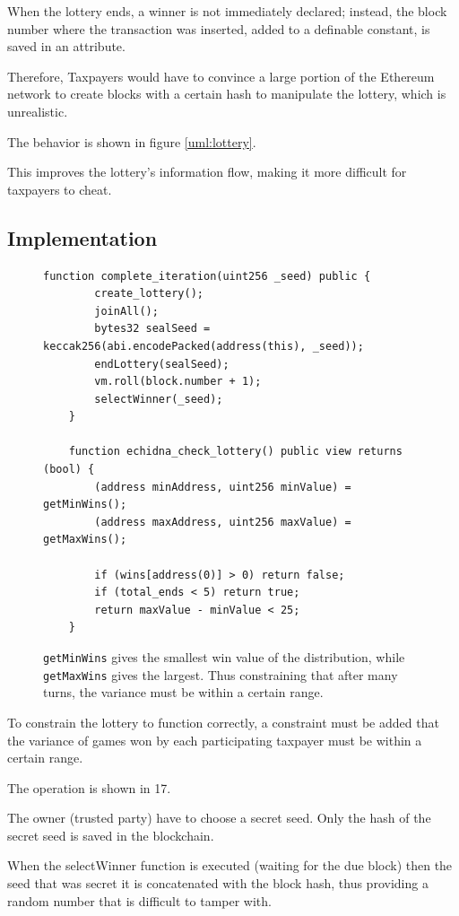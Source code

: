 \documentclass[conference]{IEEEtran}
\begin{document}
When the lottery ends, a winner is not immediately declared; instead, the block number where
the transaction was inserted, added to a definable constant, is saved in an attribute.

Therefore, Taxpayers would have to convince a large portion of the Ethereum network to create blocks with a certain hash
to manipulate the lottery, which is unrealistic.


The behavior is shown in figure \ref{uml:lottery}.

This improves the lottery's information flow, making it more difficult for taxpayers to cheat.

\subsection{Implementation}

\begin{figure}
	\label{code:V_lottery2}
	\centering
	\begin{lstlisting}[style=soliditystyle]
    function complete_iteration(uint256 _seed) public {
        create_lottery();
        joinAll();
        bytes32 sealSeed = keccak256(abi.encodePacked(address(this), _seed));
        endLottery(sealSeed);
        vm.roll(block.number + 1);
        selectWinner(_seed);
    }

    function echidna_check_lottery() public view returns (bool) {
        (address minAddress, uint256 minValue) = getMinWins();
        (address maxAddress, uint256 maxValue) = getMaxWins();

        if (wins[address(0)] > 0) return false;
        if (total_ends < 5) return true;
        return maxValue - minValue < 25;
    }
  \end{lstlisting}
	\caption{\texttt{getMinWins} gives the smallest win value of the distribution, while \texttt{getMaxWins} gives the largest. Thus constraining that after
		many turns, the variance must be within a certain range.}
\end{figure}


To constrain the lottery to function correctly, a constraint must be added
that the variance of games won by each participating taxpayer must be within a certain range.

The operation is shown in 17.%

The owner (trusted party) have to choose a secret seed. Only the hash of the secret seed is saved in the blockchain.

When the selectWinner function is executed (waiting for the due block) then the seed that was secret
it is concatenated with the block hash, thus providing a random number that is difficult to tamper with.
\end{document}

